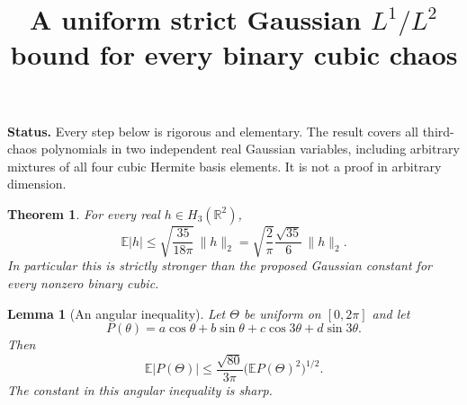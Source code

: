 \documentclass[11pt]{article}
\title{A uniform strict Gaussian $L^1/L^2$ bound for every binary cubic chaos}
\author{}
\date{}
\newtheorem{theorem}{Theorem}
\newtheorem{lemma}{Lemma}
\newcommand{\E}{\mathbb E}
\begin{document}
\maketitle
\noindent\textbf{Status.} Every step below is rigorous and elementary. The result
covers all third-chaos polynomials in two independent real Gaussian variables,
including arbitrary mixtures of all four cubic Hermite basis elements. It is
not a proof in arbitrary dimension.

\begin{theorem}\label{thm:binary}
For every real $h\in H_3(\mathbb R^2)$,
\[
 \boxed{\E|h|\leq\sqrt{\frac{35}{18\pi}}\,\|h\|_2
       =\sqrt{\frac2\pi}\frac{\sqrt{35}}6\,\|h\|_2.}
\]
In particular this is strictly stronger than the proposed Gaussian constant
for every nonzero binary cubic.
\end{theorem}

\begin{lemma}[An angular inequality]\label{lem:angular}
Let $\Theta$ be uniform on $[0,2\pi]$ and let
\[
 P(\theta)=a\cos\theta+b\sin\theta+c\cos3\theta+d\sin3\theta.
\]
Then
\[
 \E|P(\Theta)|\leq\frac{\sqrt{80}}{3\pi}
             \bigl(\E P(\Theta)^2\bigr)^{1/2}.
\]
The constant in this angular inequality is sharp.
\end{lemma}
\end{document}
